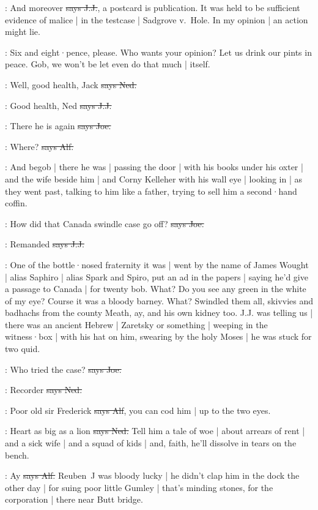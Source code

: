 \jjom:
And moreover
\sout{says J.J.},
a postcard is publication.
It was held to be sufficient evidence of malice |
in the testcase |
Sadgrove v.~Hole.
In my opinion |
an action might lie.

\Nq:
Six and eight·pence,
please.
Who wants your opinion?
Let us drink our pints in peace.
Gob,
we won't be let even do that much |
itself.

\lambert:
Well,
good health,
Jack
\sout{says Ned.}

\jjom:
Good health,
Ned
\sout{says J.J.}

\joe:
There he is again
\sout{says Joe.}

\bergan:
Where?
\sout{says Alf.}

\Nq:
And begob |
there he was
 |
passing the door |
with his books under his oxter |
and the wife beside him |
and Corny Kelleher with his wall eye |
looking in |
as they went past,
talking to him like a father,
trying to sell him a second·hand coffin.

\joe:
How did that Canada swindle case go off?
\sout{says Joe.}

\jjom:
Remanded
\sout{says J.J.}

\Nq:
One of the bottle·nosed fraternity it was |
went by the name of James Wought |
alias Saphiro |
alias Spark and Spiro,
put an ad in the papers |
saying he'd give a passage to Canada |
for twenty bob.
What?
Do you see any green in the white of my eye?
Course it was a bloody barney.
What?
Swindled them all,
skivvies and badhachs from the county Meath,
ay,
and his own kidney too.
J.J. was telling us |
there was an ancient Hebrew |
Zaretsky or something |
weeping in the witness·box |
with his hat on him,
swearing by the holy Moses |
he was stuck for two quid.

\joe:
Who tried the case?
\sout{says Joe.}

\lambert:
Recorder
\sout{says Ned.}

\bergan:
Poor old sir Frederick
\sout{says Alf},
you can cod him |
up to the two eyes.

\lambert:
Heart as big as a lion
\sout{says Ned.}
Tell him a tale of woe |
about arrears of rent |
and a sick wife |
and a squad of kids |
and,
faith,
he'll dissolve in tears on the bench.

\bergan:
Ay
\sout{says Alf.}
Reuben~J was bloody lucky |
he didn't clap him in the dock the other day |
for suing poor little Gumley |
that's minding stones,
for the corporation |
there near Butt bridge.

